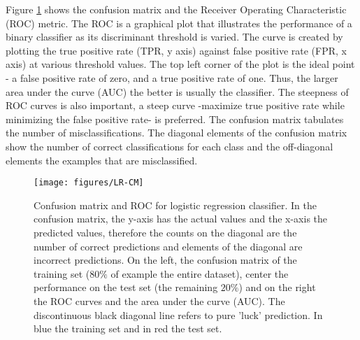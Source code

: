 \documentclass[11pt]{article}
\theoremstyle{definition}
\theoremstyle{remark}
\begin{document}
Figure \ref{fig:lr-cm} shows the confusion matrix and the Receiver Operating Characteristic (ROC) metric. 
The ROC is a graphical plot that illustrates the performance of a binary classifier as its discriminant threshold is varied. The curve is created by plotting the true positive rate (TPR, y axis) against false positive rate (FPR, x axis) at various threshold values. The top left corner of the plot is the ideal point - a false positive rate of zero, and a true positive rate of one. 
Thus, the larger area under the curve (AUC) the better is usually the classifier.
The steepness of ROC curves is also important, a steep curve -maximize true positive rate while minimizing the false positive rate- is preferred.
The confusion matrix tabulates the number of misclassifications. The diagonal elements of the confusion matrix show the number of correct classifications for each class and the off-diagonal elements the examples that are misclassified. 


\begin{figure}[H]
        \centering
        \texttt{[image: figures/LR-CM]}
        \caption{Confusion matrix and ROC for logistic regression classifier. In the confusion matrix, the y-axis has the actual values and the x-axis the predicted values, therefore the counts on the diagonal are the number of correct predictions and elements of the diagonal are incorrect predictions.
        On the left, the confusion matrix of the training set ($80\%$ of example the entire dataset), center the performance on the test set (the remaining $20\%$) and on the right the ROC curves and the area under the curve (AUC). The discontinuous black diagonal line refers to pure 'luck' prediction. In blue the training set and in red the test set.}
\label{fig:lr-cm}
\end{figure}
\end{document}

